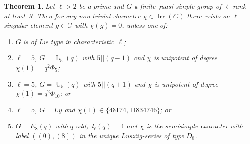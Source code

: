 \documentclass{ert-l}
\newcommand{\Irr}{{\operatorname{Irr}}}
\newcommand{\PSL}{{\operatorname{L}}}
\newcommand{\PSU}{{\operatorname{U}}}
\newtheorem{thm}{Theorem}[section]
\theoremstyle{definition}
\theoremstyle{remark}
\begin{document}
\begin{thm}   \label{thm:zeroes}
 Let $\ell>2$ be a prime and $G$ a finite quasi-simple group of $\ell$-rank at
 least~3. Then for any non-trivial character $\chi\in\Irr(G)$ there exists an
 $\ell$-singular element $g\in G$ with $\chi(g)=0$, unless one of:
 \begin{enumerate}
  \item[\rm(1)] $G$ is of Lie type in characteristic~$\ell$;
  \item[\rm(2)] $\ell=5$, $G=\PSL_5(q)$ with $5||(q-1)$ and $\chi$ is unipotent
   of degree $\chi(1)=q^2\Phi_5$;
  \item[\rm(3)] $\ell=5$, $G=\PSU_5(q)$ with $5||(q+1)$ and $\chi$ is unipotent
   of degree $\chi(1)=q^2\Phi_{10}$; or
  \item[\rm(4)] $\ell=5$, $G=Ly$ and $\chi(1)\in\{48174,11834746\}$; or
  \item[\rm(5)] $G=E_8(q)$ with $q$ odd, $d_\ell(q) = 4$ and $\chi$ is the 
   semisimple character with label $((0),(8))$ in the unique 
   Lusztig-series of type $D_8$.
 \end{enumerate}
\end{thm}
\end{document}
